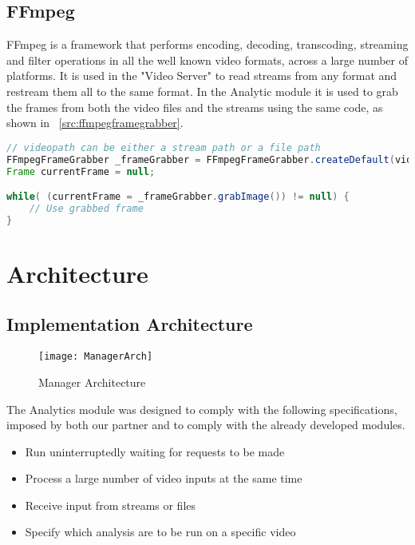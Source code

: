 \subsection{FFmpeg}
FFmpeg is a framework that performs encoding, decoding, transcoding, streaming and filter operations in all the well known video formats, across a large number of platforms. It is used in the "Video Server" to read streams from any format and restream them all to the same format. In the Analytic module it is used to grab the frames from both the video files and the streams using the same code, as shown in ~\ref{src:ffmpegframegrabber}.

\begin{lstlisting}[float,language=Java, label={src:ffmpegframegrabber}, caption=FFmpegFrameGrabber usage example] 
// videopath can be either a stream path or a file path
FFmpegFrameGrabber _frameGrabber = FFmpegFrameGrabber.createDefault(videopath);
Frame currentFrame = null;

while( (currentFrame = _frameGrabber.grabImage()) != null) {
	// Use grabbed frame
}
\end{lstlisting}

\section{Architecture}

\subsection{Implementation Architecture}

\begin{figure}[h]
  \begin{center}
    \leavevmode
    \texttt{[image: ManagerArch]}
    \caption{Manager Architecture}
    \label{fig:manager_arch}
  \end{center}
\end{figure}


The Analytics module was designed to comply with the following specifications, imposed by both our partner and to comply with the already developed modules. 

\begin{itemize}
	\item Run uninterruptedly waiting for requests to be made
	\item Process a large number of video inputs at the same time
	\item Receive input from streams or files
	\item Specify which analysis are to be run on a specific video
\end{itemize}

